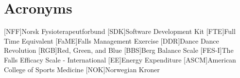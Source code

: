 \chapter*{Acronyms}
\begin{acronym}
[NFF]{Norsk Fysioterapeutforbund}
[SDK]{Software Development Kit}
[FTE]{Full Time Equivalent}
[FaME]{Falls Management Exercise}
[DDR]{Dance Dance Revolution}
[RGB]{Red, Green, and Blue}
[BBS]{Berg Balance Scale}
[FES-I]{The Falls Efficacy Scale - International}
[EE]{Energy Expenditure} 
[ASCM]{American College of Sports Medicine} 
[NOK]{Norwegian Kroner} 
\end{acronym}

